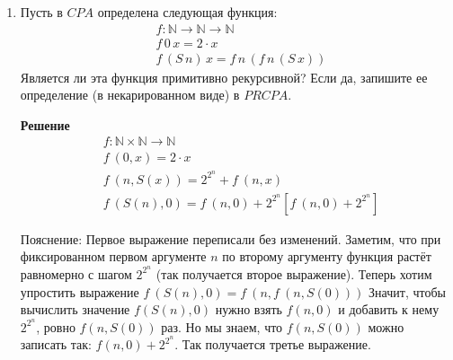 \begin{enumerate}

\item Пусть в $CPA$ определена следующая функция:
\begin{align*}
& f : \mathbb{N} \to \mathbb{N} \to \mathbb{N} \\
& f\,0\,x = 2 \cdot x \\
& f\,(S\,n)\,x = f\,n\,(f\,n\,(S\,x))
\end{align*}
Является ли эта функция примитивно рекурсивной? Если да, запишите ее определение (в некарированном виде) в 
$PRCPA$.

\textbf{Решение}
\begin{align*}
& f : \mathbb{N} \times \mathbb{N} \to \mathbb{N} \\
& f \ (0,x) = 2 \cdot x \\
& f \ (n, S(x)) = 2 ^ {2 ^ n} + f \ (n, x) \\
& f \ (S(n), 0) = f \ (n, 0) + 2 ^ {2 ^ n} \left[ f \ (n, 0) + 2 ^ {2 ^ n}\right]
\end{align*}

Пояснение: Первое выражение переписали без изменений. Заметим, что при фиксированном первом аргументе $n$ по 
второму аргументу функция растёт равномерно с шагом $2^{2 ^ n}$ (так получается второе выражение). Теперь хотим 
упростить выражение $f \ (S(n), 0) = f \ (n, f \ (n, S(0)))$ Значит, чтобы вычислить значение $f(S(n), 0)$ нужно 
взять $f(n, 0)$ и добавить к нему $2^{2^n}$, ровно $f(n, S(0))$ раз. Но мы знаем, что $f(n, S(0))$ можно записать 
так: $f(n, 0) + 2^{2^n}$. Так получается третье выражение.

\end{enumerate}
